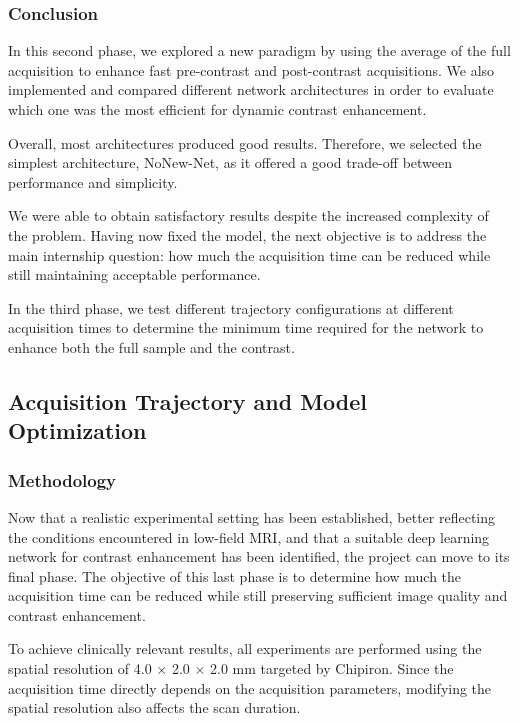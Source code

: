 \documentclass[12pt]{article}
\begin{document}
\subsubsection{Conclusion} 
In this second phase, we explored a new paradigm by using the average of the full acquisition to enhance fast pre-contrast and post-contrast acquisitions.
We also implemented and compared different network architectures in order to evaluate which one was the most efficient for dynamic contrast enhancement.
\vspace{0.5cm}

Overall, most architectures produced good results.
Therefore, we selected the simplest architecture, NoNew-Net, as it offered a good trade-off between performance and simplicity.
\vspace{0.5cm}

We were able to obtain satisfactory results despite the increased complexity of the problem.
Having now fixed the model, the next objective is to address the main internship question: how much the acquisition time can be reduced while still maintaining acceptable performance.
\vspace{0.5cm}

In the third phase, we test different trajectory configurations at different acquisition times to determine
the minimum time required for the network to enhance both the full sample and the contrast.

\subsection{Acquisition Trajectory and Model Optimization} 
\subsubsection{Methodology} 

Now that a realistic experimental setting has been established, better reflecting the conditions encountered in low-field MRI, and that a suitable deep learning network for contrast enhancement has been identified, the project can move to its final phase.
The objective of this last phase is to determine how much the acquisition time can be reduced while still preserving sufficient image quality and contrast enhancement.

To achieve clinically relevant results, all experiments are performed using the spatial resolution of 4.0 × 2.0 × 2.0 mm targeted by Chipiron.
Since the acquisition time directly depends on the acquisition parameters, modifying the spatial resolution also affects the scan duration.
\end{document}
